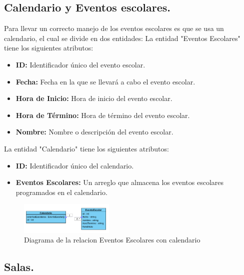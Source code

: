 \clearpage


\subsection{Calendario y Eventos escolares.}

Para llevar un correcto manejo de los eventos escolares es que se usa un calendario, el cual se divide en dos entidades:
La entidad "Eventos Escolares" tiene los siguientes atributos:

\begin{itemize}
\item \textbf{ID:} Identificador único del evento escolar.
\item \textbf{Fecha:} Fecha en la que se llevará a cabo el evento escolar.
\item \textbf{Hora de Inicio:} Hora de inicio del evento escolar.
\item \textbf{Hora de Término:} Hora de término del evento escolar.
\item \textbf{Nombre:} Nombre o descripción del evento escolar.
\end{itemize}

La entidad "Calendario" tiene los siguientes atributos:

\begin{itemize}
\item \textbf{ID:} Identificador único del calendario.
\item \textbf{Eventos Escolares:} Un arreglo que almacena los eventos escolares programados en el calendario.
\end{itemize}


\begin{figure}[htbp]
\centering
\includegraphics[width=0.4\textwidth]{images/arqui/colCaEv.png}
\caption{Diagrama de la relacion Eventos Escolares con calendario}
\label{fig:colecEventCald}
\end{figure}

\clearpage


\subsection{Salas.}


